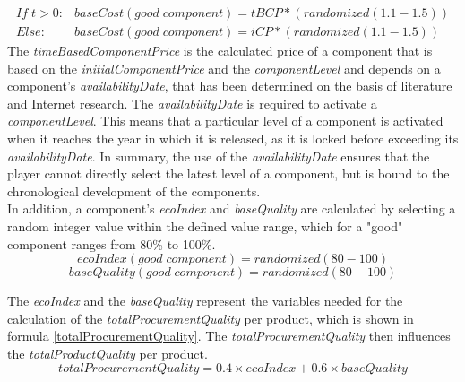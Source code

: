\begin{equation}
\begin{aligned}
    If \; t > 0: &baseCost(good \; component) = tBCP * (randomized(1.1-1.5))\\
    Else : &baseCost(good \; component) = iCP * (randomized(1.1-1.5))
\end{aligned}    
\end{equation}
The \textit{timeBasedComponentPrice} is the calculated price of a component that is based on the \textit{initialComponentPrice} and the \textit{componentLevel} and depends on a component's \textit{availabilityDate}, that has been determined on the basis of literature and Internet research. The \textit{availabilityDate} is required to activate a \textit{componentLevel}. This means that a particular level of a component is activated when it reaches the year in which it is released, as it is locked before exceeding its \textit{availabilityDate}. In summary, the use of the \textit{availabilityDate} ensures that the player cannot directly select the latest level of a component, but is bound to the chronological development of the components.\\
In addition, a component's \textit{ecoIndex} and \textit{baseQuality} are calculated by selecting a random integer value within the defined value range, which for a "good" component ranges from 80\% to 100\%.
\begin{equation}
    ecoIndex(good \; component) = randomized(80-100)
\end{equation}
\begin{equation}
    baseQuality(good \; component) = randomized(80-100)
\end{equation}

The \textit{ecoIndex} and the \textit{baseQuality} represent the variables needed for the calculation of the \textit{totalProcurementQuality} per product, which is shown in formula \ref{totalProcurementQuality}. The \textit{totalProcurementQuality} then influences the \textit{totalProductQuality} per product.\\

\begin{equation}
\label{totalProcurementQuality}
    totalProcurementQuality = 0.4 \times ecoIndex + 0.6 \times baseQuality
\end{equation}

